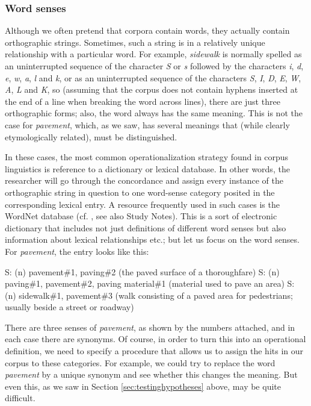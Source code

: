 \subsubsection{Word senses}
\label{sec:operationalizingwordsenses}

Although we often pretend that corpora contain words, they actually contain orthographic strings. Sometimes, such a string is in a relatively unique relationship with a particular word. For example, \textit{sidewalk} is normally spelled as an uninterrupted sequence of the character \textit{S} or \textit{s} followed by the characters \textit{i}, \textit{d}, \textit{e}, \textit{w}, \textit{a}, \textit{l} and \textit{k}, or as an uninterrupted sequence of the characters \textit{S}, \textit{I}, \textit{D}, \textit{E}, \textit{W}, \textit{A}, \textit{L} and \textit{K}, so (assuming that the corpus does not contain hyphens inserted at the end of a line when breaking the word across lines), there are just three orthographic forms; also, the word always has the same meaning. This is not the case for \textit{pavement}, which, as we saw, has several meanings that (while clearly etymologically related), must be distinguished.

In these cases, the most common operationalization strategy found in corpus linguistics is reference to a dictionary or lexical database. In other words, the researcher will go through the concordance and assign every instance of the orthographic string in question to one word-sense category posited in the corresponding lexical entry. A resource frequently used in such cases is the WordNet database (cf. \citealt{fellbaum_wordnet:_1998}, see also Study Notes). This is a sort of electronic dictionary that includes not just definitions of different word senses but also information about lexical relationships etc.; but let us focus on the word senses. For \textit{pavement}, the entry looks like this:

\begin{exe}
\ex 
\begin{xlist} 
\label{ex:wordnetpavement}
\ex S: (n) pavement\#1, paving\#2 (the paved surface of a thoroughfare)
\ex S: (n) paving\#1, pavement\#2, paving material\#1 (material used to pave an area)
\ex S: (n) sidewalk\#1, pavement\#3 (walk consisting of a paved area for pedestrians; usually beside a street or roadway)
\end{xlist}
\end{exe}

There are three senses of \textit{pavement}, as shown by the numbers attached, and in each case there are synonyms. Of course, in order to turn this into an operational definition, we need to specify a procedure that allows us to assign the hits in our corpus to these categories. For example, we could try to replace the word \textit{pavement} by a unique synonym and see whether this changes the meaning. But even this, as we saw in Section \ref{sec:testinghypotheses} above, may be quite difficult.

